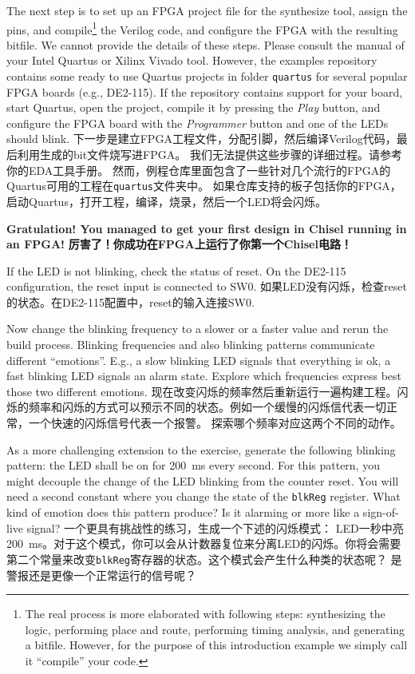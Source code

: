 \documentclass[%
    10pt,
    headinclude, footexclude,
    openright, %
    notitlepage,
    cleardoubleempty,
    headsepline,
    pointlessnumbers,
    bibtotoc, idxtotoc,
    ]{scrbook}
\newcommand{\code}[1]{{\small{\texttt{#1}}}}
\begin{document}
The next step is to set up an FPGA project file for the synthesize tool, assign the pins,
and compile\footnote{The real process is more elaborated with following steps: synthesizing the logic,
performing place and route, performing timing analysis, and generating a bitfile.
However, for the purpose of this introduction example we simply call it ``compile''
your code.} the Verilog code, and configure the FPGA with the resulting bitfile.
We cannot provide the details of these steps. Please consult the manual of
your Intel Quartus or Xilinx Vivado tool.
However, the examples repository contains some ready to use Quartus
projects in folder \code{quartus} for several popular FPGA boards (e.g., DE2-115).
If the repository contains support for your board, start Quartus, open the project,
compile it by pressing the \emph{Play} button, and configure the FPGA board
with the \emph{Programmer} button and one of the LEDs should blink.
下一步是建立FPGA工程文件，分配引脚，然后编译Verilog代码，最后利用生成的bit文件烧写进FPGA。
我们无法提供这些步骤的详细过程。请参考你的EDA工具手册。
然而，例程仓库里面包含了一些针对几个流行的FPGA的Quartus可用的工程在\code{quartus}文件夹中。
如果仓库支持的板子包括你的FPGA，启动Quartus，打开工程，编译，烧录，然后一个LED将会闪烁。

{\bf Gratulation! You managed to get your first design in Chisel running in an FPGA!}
{\bf 厉害了！你成功在FPGA上运行了你第一个Chisel电路！}

If the LED is not blinking, check the status of reset. On the DE2-115 configuration,
the reset input is connected to SW0.
如果LED没有闪烁，检查reset的状态。在DE2-115配置中，reset的输入连接SW0.

Now change the blinking frequency to a slower or a faster value and
rerun the build process. Blinking frequencies and also blinking patterns
communicate different ``emotions''. E.g., a slow blinking LED signals that
everything is ok, a fast blinking LED signals an alarm state.
Explore which frequencies express best those two different emotions.
现在改变闪烁的频率然后重新运行一遍构建工程。闪烁的频率和闪烁的方式可以预示不同的状态。例如一个缓慢的闪烁信代表一切正常，一个快速的闪烁信号代表一个报警。
探索哪个频率对应这两个不同的动作。

As a more challenging extension to the exercise, generate the following blinking pattern:
the LED shall be on for 200~ms every second. For this pattern, you might
decouple the change of the LED blinking from the counter reset.
You will need a second constant where you change the state of the
\code{blkReg} register. What kind of emotion does this pattern produce?
Is it alarming or more like a sign-of-live signal?
一个更具有挑战性的练习，生成一个下述的闪烁模式：
LED一秒中亮200~ms。对于这个模式，你可以会从计数器复位来分离LED的闪烁。你将会需要第二个常量来改变\code{blkReg}寄存器的状态。这个模式会产生什么种类的状态呢？
是警报还是更像一个正常运行的信号呢？
\end{document}
